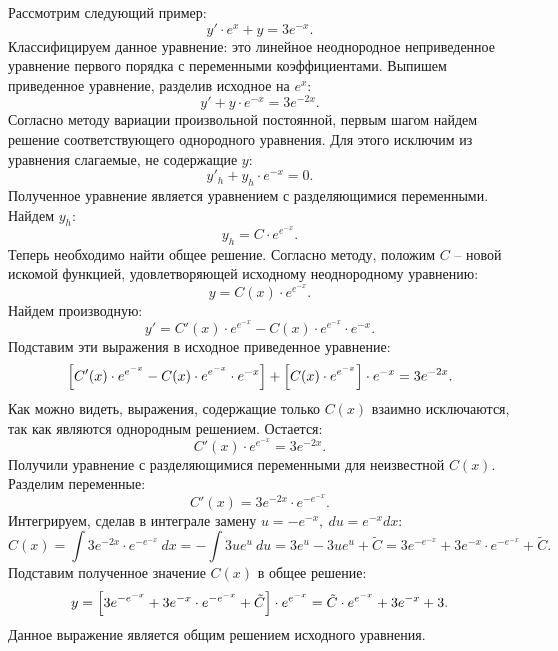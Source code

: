 		Рассмотрим следующий пример:
		\[ y' \cdot e^x + y = 3e^{-x}. \]
		Классифицируем данное уравнение: это линейное неоднородное неприведенное уравнение первого порядка с переменными коэффициентами. Выпишем приведенное уравнение, разделив исходное на $e^x$:
		\[ y' + y \cdot e^{-x} = 3e^{-2x}. \]
		Согласно методу вариации произвольной постоянной, первым шагом найдем решение соответствующего однородного уравнения. Для этого исключим из уравнения слагаемые, не содержащие $y$:
		\[ y'_h + y_h \cdot e^{-x} = 0. \]
		Полученное уравнение является уравнением с разделяющимися переменными. Найдем $y_h$:
		\[ y_h = C \cdot e^{e^{-x}}. \]
		Теперь необходимо найти общее решение. Согласно методу, положим $C$ -- новой искомой функцией, удовлетворяющей исходному неоднородному уравнению:
		\[ y = C(x) \cdot e^{e^{-x}}. \]
		Найдем производную:
		\[ y' = C'(x) \cdot e^{e^{-x}} - C(x) \cdot e^{e^{-x}} \cdot e^{-x}. \]
		Подставим эти выражения в исходное приведенное уравнение:
		\[ \left[ C'(x) \cdot e^{e^{-x}} - C(x) \cdot e^{e^{-x}} \cdot e^{-x} \right] + \left[ C(x) \cdot e^{e^{-x}} \right] \cdot e^{-x} = 3e^{-2x}. \]
		Как можно видеть, выражения, содержащие только $C(x)$ взаимно исключаются, так как являются однородным решением. Остается:
		\[ C'(x) \cdot e^{e^{-x}} = 3e^{-2x}. \]
		Получили уравнение с разделяющимися переменными для неизвестной $C(x)$. Разделим переменные:
		\[ C'(x) = 3e^{-2x} \cdot e^{-e^{-x}}. \]
		Интегрируем, сделав в интеграле замену $u = -e^{-x}, ~ du = e^{-x} dx$:
		\[ C(x) = \int 3e^{-2x} \cdot e^{-e^{-x}} ~ dx = -\int 3u e^u ~ du = 3e^u - 3u e^{u} + \tilde{C} = 3e^{-e^{-x}} + 3e^{-x} \cdot e^{-e^{-x}} + \tilde{C}. \]
		Подставим полученное значение $C(x)$ в общее решение:
		\[ y = \left[ 3e^{-e^{-x}} + 3e^{-x} \cdot e^{-e^{-x}} + \tilde{C} \right] \cdot e^{e^{-x}} = \tilde{C} \cdot e^{e^{-x}} + 3e^{-x} + 3. \]
		Данное выражение является общим решением исходного уравнения. 

